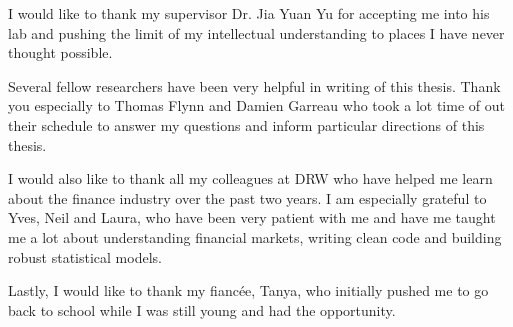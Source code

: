 \begin{acknowledgments}
  
  I would like to thank my supervisor Dr. Jia Yuan Yu for accepting me into his lab and pushing the limit of my intellectual understanding to places I have never thought possible. 
  
 Several fellow researchers have been very helpful in writing of this thesis. Thank you especially to Thomas Flynn and Damien Garreau who took a lot time of out their schedule to answer my questions and inform particular directions of this thesis.
  
  I would also like to thank all my colleagues at DRW who have helped me learn about the finance industry over the past two years. I am especially grateful to Yves, Neil and Laura, who have been very patient with me and have me taught me a lot about understanding financial markets, writing clean code and building robust statistical models.
  
  Lastly, I would like to thank my fiancée, Tanya, who initially pushed me to go back to school while I was still young and had the opportunity. 
\end{acknowledgments}